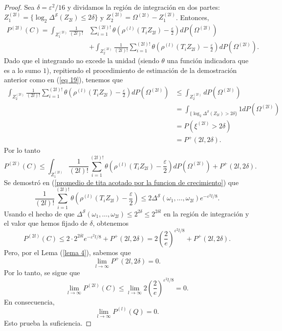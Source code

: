 \documentclass{report}
\begin{document}
\begin{proof}
Sea \( \delta = \varepsilon^2 / 16 \) y dividamos la región de integración en dos partes:
\( Z_1^{(2l)} = \{ \log_2 \Delta^{\mathcal{S}}(Z_{2l}) \leq 2\delta \} \) y
\( Z_2^{(2l)} = \Omega^{(2l)} - Z_1^{(2l)} \). Entonces,
\begin{equation*}
    \begin{split}
        P^{(2l)}(C) = \int_{Z_1^{(2l)}} \frac{1}{(2l)!} &\sum_{i=1}^{(2l)!} \theta \left( \rho^{(l)}(T_i Z_{2l}) - \frac{\varepsilon}{2} \right) dP(\Omega^{(2l)})\\
        &+ \int_{Z_2^{(2l)}} \frac{1}{(2l)!} \sum_{i=1}^{(2l)!} \theta \left( \rho^{(l)}(T_i Z_{2l}) - \frac{\varepsilon}{2} \right) dP(\Omega^{(2l)}).
    \end{split}
\end{equation*}
Dado que el integrando no excede la unidad (siendo $\theta$ una función indicadora que es a lo sumo $1$), repitiendo el procedimiento de estimación de la demostración anterior como en
(\ref{eq 19}), tenemos que
\begin{equation*}
    \begin{split}
        \int_{Z_2^{(2l)}} \frac{1}{(2l)!} \sum_{i=1}^{(2l)!} \theta \left( \rho^{(l)}(T_i Z_{2l}) - \frac{\varepsilon}{2} \right) dP(\Omega^{(2l)})
        & \leq \int_{Z_2^{(2l)}} dP(\Omega^{(2l)}) \\
        & =  \int_{\{ \log_2 \Delta^{\mathcal{S}}(Z_{2l}) > 2\delta \}} 1 dP(\Omega^{(2l)})\\
        & = P(\xi^{(2l)} > 2\delta)\\
        & = P^+(2l, 2\delta).
    \end{split}
\end{equation*}
Por lo tanto
\[
P^{(2l)}(C) \leq \int_{Z_1^{(2l)}} \frac{1}{(2l)!} \sum_{i=1}^{(2l)!} \theta \left( \rho^{(l)}(T_i Z_{2l}) - \frac{\varepsilon}{2} \right) dP(\Omega^{(2l)}) + P^+(2l, 2\delta).
\]
Se demostró en (\ref{promedio de tita acotado por la funcion de crecimiento}) que
\[
\frac{1}{(2l)!} \sum_{i=1}^{(2l)!} \theta \left( \rho^{(l)}(T_i Z_{2l}) - \frac{\varepsilon}{2} \right) \leq 2 \Delta^{\mathcal{S}}(\omega_1, \dots, \omega_{2l}) e^{-\varepsilon^2 l / 8}.
\]
Usando el hecho de que \( \Delta^{\mathcal{S}}(\omega_1, \dots, \omega_{2l}) \leq 2^{2\delta} \leq 2^{2\delta l} \) en la región de integración y el valor que hemos
fijado de $\delta$, obtenemos
\[
P^{(2l)}(C) \leq 2 \cdot 2^{2\delta l} e^{-\varepsilon^2 l / 8} + P^+(2l, 2\delta) = 2\left(\frac{2}{e}\right)^{\varepsilon^2 l / 8} + P^+(2l, 2\delta).
\]
Pero, por el Lema (\ref{lema 4}), sabemos que
\[
\lim_{l \to \infty} P^+(2l, 2\delta) = 0 .
\]
Por lo tanto, se sigue que
\[
    \lim_{l \to \infty} P^{(2l)}(C) \leq \lim_{l \to \infty}  2\left(\frac{2}{e}\right)^{\varepsilon^2 l / 8}= 0.
\]
En consecuencia,
\[ \lim_{l \to \infty} P^{(l)}(Q) = 0. \]
Esto prueba la suficiencia.
\bigbreak


\end{proof}
\end{document}
